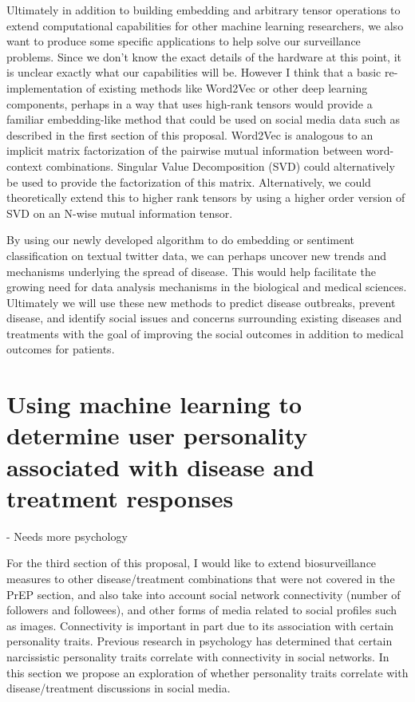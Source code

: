 Ultimately in addition to building embedding and arbitrary tensor operations to extend computational capabilities for other machine learning researchers, we also want to produce some specific applications to help solve our surveillance problems. Since we don't know the exact details of the hardware at this point, it is unclear exactly what our capabilities will be. However I think that a basic re-implementation of existing methods like Word2Vec or other deep learning components, perhaps in a way that uses high-rank tensors would provide a familiar embedding-like method that could be used on social media data such as described in the first section of this proposal. Word2Vec is analogous to an implicit matrix factorization of the pairwise mutual information between word-context combinations\cite{levy2014neural}. Singular Value Decomposition (SVD) could alternatively be used to provide the factorization of this matrix. Alternatively, we could theoretically extend this to higher rank tensors by using a higher order version of SVD on an N-wise mutual information tensor.

By using our newly developed algorithm to do embedding or sentiment classification on textual twitter data, we can perhaps uncover new trends and mechanisms underlying the spread of disease. This would help facilitate the growing need for data analysis mechanisms in the biological and medical sciences\cite{cichocki2014era}. Ultimately we will use these new methods to predict disease outbreaks, prevent disease, and identify social issues and concerns surrounding existing diseases and treatments with the goal of improving the social outcomes in addition to medical outcomes for patients.


\section{Using machine learning to determine user personality associated with disease and treatment responses}

- Needs more psychology

For the third section of this proposal, I would like to extend biosurveillance measures to other disease/treatment combinations that were not covered in the PrEP section, and also take into account social network connectivity (number of followers and followees), and other forms of media related to social profiles such as images. Connectivity is important in part due to its association with certain personality traits. Previous research in psychology has determined that certain narcissistic personality traits correlate with connectivity in social networks\cite{buffardi2008narcissism}. In this section we propose an exploration of whether personality traits correlate with disease/treatment discussions in social media.


